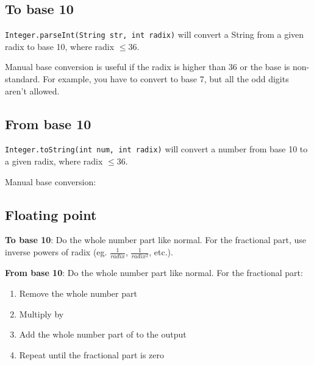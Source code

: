 
\subsection*{To base 10}

\lstinline{Integer.parseInt(String str, int radix)} will convert a String from a given radix to base 10, where radix $\leq 36$.

Manual base conversion is useful if the radix is higher than 36 or the base is non-standard. For example, you have to convert to base 7, but all the odd digits aren't allowed.



\subsection*{From base 10}

\lstinline{Integer.toString(int num, int radix)} will convert a number from base 10 to a given radix, where radix $\leq 36$.

Manual base conversion:


\subsection*{Floating point}

\textbf{To base 10}: Do the whole number part like normal. For the fractional part, use inverse powers of radix (eg. $\frac{1}{radix}$, $\frac{1}{radix^2}$, etc.).

\textbf{From base 10}: Do the whole number part like normal. For the fractional part:

\begin{enumerate}
    \item Remove the whole number part
    \item Multiply  by 
    \item Add the whole number part of  to the output
    \item Repeat until the fractional part is zero
\end{enumerate}

\newpage
